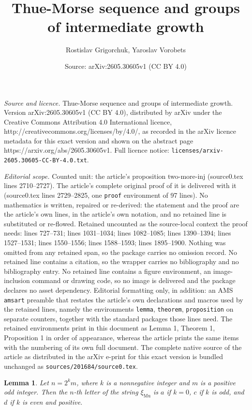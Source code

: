 \documentclass[10pt,a4paper]{amsart}
\title{Thue-Morse sequence and groups of intermediate growth}
\author{Rostislav Grigorchuk, Yaroslav Vorobets}
\date{Source: arXiv:2605.30605v1 (CC BY 4.0)}
\newtheorem{lemma}{Lemma}
\def\xiGE{\xi_{\mathrm{Mu}}}
\begin{document}
\maketitle

\noindent\emph{Source and licence.} Thue-Morse sequence and groups of intermediate growth. Version arXiv:2605.30605v1 (CC BY 4.0), distributed by arXiv under the Creative Commons Attribution 4.0 International licence, http://creativecommons.org/licenses/by/4.0/, as recorded in the arXiv licence metadata for this exact version and shown on the abstract page https://arxiv.org/abs/2605.30605v1. Full licence notice: \texttt{licenses/arxiv-2605.30605-CC-BY-4.0.txt}.\par\smallskip

\noindent\textit{Editorial scope.} Counted unit: the article's proposition two-more-inj (source0.tex lines 2710--2727). The article's complete original proof of it is delivered with it (source0.tex lines 2729--2825, one \texttt{proof} environment of 97 lines). No mathematics is written, repaired or re-derived: the statement and the proof are the article's own lines, in the article's own notation, and no retained line is substituted or re-flowed.  Retained uncounted as the source-local context the proof needs: lines 727--731; lines 1031--1034; lines 1082--1085; lines 1390--1394; lines 1527--1531; lines 1550--1556; lines 1588--1593; lines 1895--1900.  Nothing was omitted from any retained span, so the package carries no omission record.  No retained line contains a citation, so the wrapper carries no bibliography and no bibliography entry.  No retained line contains a figure environment, an image-inclusion command or drawing code, so no image is delivered and the package declares no asset dependency.  Editorial formatting only, in addition: an AMS \texttt{amsart} preamble that restates the article's own declarations and macros used by the retained lines, namely the environments \texttt{lemma}, \texttt{theorem}, \texttt{proposition} on separate counters, together with the standard packages those lines need.  The retained environments print in this document as Lemma 1, Theorem 1, Proposition 1 in order of appearance, whereas the article prints the same items with the numbering of its own full document.  The complete native source of the article as distributed in the arXiv e-print for this exact version is bundled unchanged as \texttt{sources/201684/source0.tex}.
\begin{lemma}\label{xi-GE}
Let $n=2^km$, where $k$ is a nonnegative integer and $m$ is a positive odd 
integer.  Then the $n$-th letter of the string $\xiGE$ is $a$ if $k=0$, $c$ 
if $k$ is odd, and $d$ if $k$ is even and positive.
\end{lemma}
\end{document}
